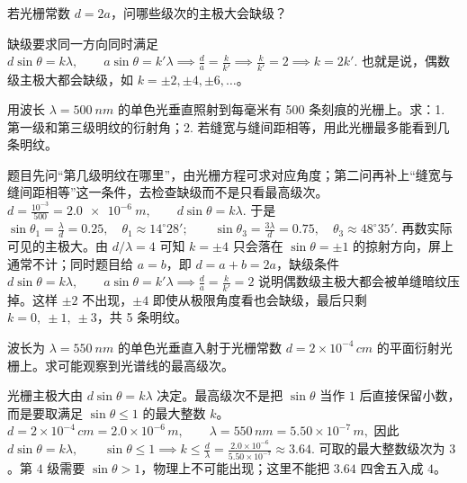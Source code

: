 \documentclass[lang=cn,11pt]{elegantbook}
\begin{document}
\begin{exercise}[缺级判断]
若光栅常数 \(d=2a\)，问哪些级次的主极大会缺级？
\end{exercise}

\begin{solution}
缺级要求同一方向同时满足
 \(d\sin\theta=k\lambda,\qquad a\sin\theta=k'\lambda \implies \frac{d}{a}=\frac{k}{k'} \implies \frac{k}{k'}=2 \implies k=2k'.\) 
也就是说，偶数级主极大都会缺级，如 \(k=\pm2,\pm4,\pm6,\dots\)。
\end{solution}

\begin{exercise}
用波长 \(\lambda=\SI{500}{nm}\) 的单色光垂直照射到每毫米有 500 条刻痕的光栅上。求：1. 第一级和第三级明纹的衍射角；2. 若缝宽与缝间距相等，用此光栅最多能看到几条明纹。
\end{exercise}

\begin{solution}
题目先问“第几级明纹在哪里”，由光栅方程可求对应角度；第二问再补上“缝宽与缝间距相等”这一条件，去检查缺级而不是只看最高级次。
 \(d=\frac{10^{-3}}{500}=\SI{2.0e-6}{m},\qquad d\sin\theta=k\lambda.\) 
于是
 \(\sin\theta_1=\frac{\lambda}{d}=0.25,\quad \theta_1\approx14^\circ 28';\qquad \sin\theta_3=\frac{3\lambda}{d}=0.75,\quad \theta_3\approx48^\circ 35'.\) 
再数实际可见的主极大。由 \(d/\lambda=4\) 可知 \(k=\pm4\) 只会落在 \(\sin\theta=\pm1\) 的掠射方向，屏上通常不计；同时题目给 \(a=b\)，即 \(d=a+b=2a\)，缺级条件
 \(d\sin\theta=k\lambda,\qquad a\sin\theta=k'\lambda \implies \frac{d}{a}=\frac{k}{k'}=2\) 
说明偶数级主极大都会被单缝暗纹压掉。这样 \(\pm2\) 不出现，\(\pm4\) 即使从极限角度看也会缺级，最后只剩 \(k=0,\ \pm1,\ \pm3\)，共 5 条明纹。
\end{solution}

\begin{exercise}
波长为 \(\lambda=\SI{550}{nm}\) 的单色光垂直入射于光栅常数 \(d=2\times10^{-4}\,\si{cm}\) 的平面衍射光栅上。求可能观察到光谱线的最高级次。
\end{exercise}

\begin{solution}
光栅主极大由 \(d\sin\theta=k\lambda\) 决定。最高级次不是把 \(\sin\theta\) 当作 \(1\) 后直接保留小数，而是要取满足 \(\sin\theta\le1\) 的最大整数 \(k\)。
 \(d=2\times10^{-4}\,\si{cm}=2.0\times10^{-6}\,\si{m}, \qquad \lambda=550\,\si{nm}=5.50\times10^{-7}\,\si{m},\) 
因此
 \(d\sin\theta=k\lambda,\qquad \sin\theta\le1 \implies k\le\frac{d}{\lambda} =\frac{2.0\times10^{-6}}{5.50\times10^{-7}}\approx3.64.\) 
可取的最大整数级次为 \(3\)。第 \(4\) 级需要 \(\sin\theta>1\)，物理上不可能出现；这里不能把 \(3.64\) 四舍五入成 \(4\)。
\end{solution}
\end{document}
